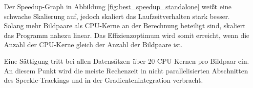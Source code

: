 Der Speedup-Graph in Abbildung \ref{fig:best_speedup_standalone} weißt eine schwache Skalierung auf, jedoch skaliert das Laufzeitverhalten stark besser. Solang mehr Bildpaare als \gls{CPU}-Kerne an der Berechnung beteiligt sind, skaliert das Programm nahezu linear. Das Effizienzoptimum wird somit erreicht, wenn die Anzahl der \gls{CPU}-Kerne gleich der Anzahl der Bildpaare ist. 

Eine Sättigung tritt bei allen Datensätzen über 20 \gls{CPU}-Kernen pro Bildpaar ein. An diesem Punkt wird die meiste Rechenzeit in nicht parallelisierten Abschnitten des Speckle-Trackings und in der Gradientenintegration verbracht.